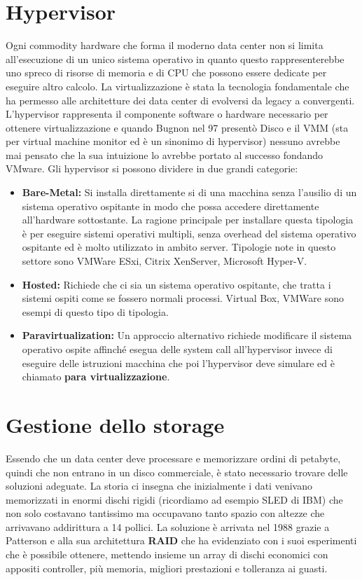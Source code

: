 \section{Hypervisor}
Ogni commodity hardware che forma il moderno data center non si limita all'esecuzione di un unico sistema operativo in quanto questo rappresenterebbe uno spreco di risorse di memoria e di CPU che possono essere dedicate per eseguire altro calcolo. La virtualizzazione è stata la tecnologia fondamentale che ha permesso alle architetture dei data center di evolversi da legacy a convergenti. L'hypervisor rappresenta il componente software o hardware necessario per ottenere virtualizzazione e quando Bugnon nel 97 presentò Disco\cite{bugnon97} e il VMM (sta per virtual machine monitor ed è un sinonimo di hypervisor) nessuno avrebbe mai pensato che la sua intuizione lo avrebbe portato al successo fondando VMware. Gli hypervisor si possono dividere in due grandi categorie:
\begin{itemize}
	\item \textbf{Bare-Metal:} Si installa direttamente si di una macchina senza l'ausilio di un sistema operativo ospitante in modo che possa accedere direttamente all'hardware sottostante. La ragione principale per installare questa tipologia è per eseguire sistemi operativi multipli, senza overhead del sistema operativo ospitante ed è molto utilizzato in ambito server. Tipologie note in questo settore sono VMWare ESxi, Citrix XenServer, Microsoft Hyper-V.
	\item \textbf{Hosted:} Richiede che ci sia un sistema operativo ospitante, che tratta i sistemi ospiti come se fossero normali processi. Virtual Box, VMWare sono esempi di questo tipo di tipologia.
	\item \textbf{Paravirtualization:} Un approccio alternativo richiede modificare il sistema operativo ospite affinché esegua delle system call all'hypervisor invece di eseguire delle istruzioni macchina che poi l'hypervisor deve simulare ed è chiamato \textbf{para virtualizzazione}. 
\end{itemize} 
\section{Gestione dello storage}
Essendo che un data center deve processare e memorizzare ordini di petabyte, quindi che non entrano in un disco commerciale, è stato necessario trovare delle soluzioni adeguate. La storia ci insegna che inizialmente i dati venivano memorizzati in enormi dischi rigidi (ricordiamo ad esempio SLED di IBM) che non solo costavano tantissimo ma occupavano tanto spazio con altezze che arrivavano addirittura a 14 pollici. La soluzione è arrivata nel 1988 grazie a Patterson e alla sua architettura \textbf{RAID} che ha evidenziato con i suoi esperimenti\cite{patterson88} che è possibile ottenere, mettendo insieme un array di dischi economici con appositi controller, più memoria, migliori prestazioni e tolleranza ai guasti.
